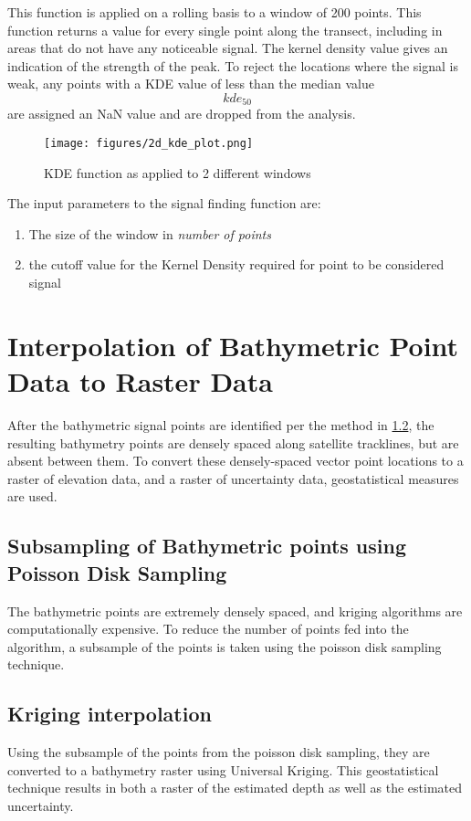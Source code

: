 This function is applied on a rolling basis to a window of 200 points. This function returns a value for every single point along the transect, including in areas that do not have any noticeable signal. The kernel density value gives an indication of the strength of the peak. To reject the locations where the signal is weak, any points with a KDE value of less than the median value $$ kde_{50} $$  are assigned an NaN value and are dropped from the analysis.

\begin{figure}[htbp]
    \centering
    \texttt{[image: figures/2d\_kde\_plot.png]}
    \caption{KDE function as applied to 2 different windows}
    \label{fig:kdefunc}
\end{figure}

The input parameters to the signal finding function are:

\begin{enumerate}
    \item The size of the window in \emph{number of points}
    \item the cutoff value for the Kernel Density required for point to be considered signal
\end{enumerate}

\section{Interpolation of Bathymetric Point Data to Raster Data}

After the bathymetric signal points are identified per the method in \ref{}, the resulting bathymetry points are densely spaced along satellite tracklines, but are absent between them. To convert these densely-spaced vector point locations to a raster of elevation data, and a raster of uncertainty data, geostatistical measures are used.

\subsection{Subsampling of Bathymetric points using Poisson Disk Sampling} \label{subsec:poissonsubsampling}
The bathymetric points are extremely densely spaced, and kriging algorithms are computationally expensive. To reduce the number of points fed into the algorithm, a subsample of the points is taken using the poisson disk sampling technique. 

\subsection{Kriging interpolation}
Using the subsample of the points from the poisson disk sampling, they are converted to a bathymetry raster using Universal Kriging. This geostatistical technique results in both a raster of the estimated depth as well as the estimated uncertainty. 


